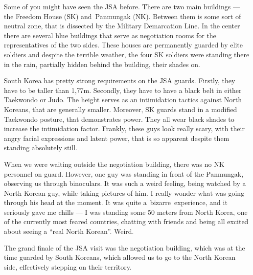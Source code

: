 \begin{post}
\begin{content}
Some of you might have seen the JSA before. There are two main buildings — the Freedom House (SK) and Pan\-mun\-gak (NK). Between them is some sort of neutral zone, that is dissected by the Military Demarcation Line. In the center there are several blue buildings that serve as negotiation rooms for the representatives of the two sides. These houses are permanently guarded by elite soldiers and despite the terrible weather, the four SK soldiers were standing there in the rain, partially hidden behind the building, their shades on.

South Korea has pretty strong requirements on the JSA guards. Firstly, they have to be taller than 1,77m. Secondly, they have to have a black belt in either Taekwondo or Judo. The height serves as an intimidation tactics against North Koreans, that are generally smaller. Moreover, SK guards stand in a modified Taekwondo posture, that demonstrates power. They all wear black shades to increase the intimidation factor. Frankly, these guys look really scary, with their angry facial expressions and latent power, that is so apparent despite them standing absolutely still.

When we were waiting outside the negotiation building, there was no NK personnel on guard. However, one guy was standing in front of the Panmungak, observing us through binoculars. It was such a weird feeling, being watched by a North Korean guy, while taking pictures of him. I really wonder what was going through his head at the moment. It was quite a bizarre experience, and it seriously gave me chills — I was standing some 50 meters from North Korea, one of the currently most feared countries, chatting with friends and being all excited about seeing a ``real North Korean''. Weird.


The grand finale of the JSA visit was the negotiation building, which was at the time guarded by South Koreans, which allowed us to go to the North Korean side, effectively stepping on their territory.



\end{content}
\end{post}
